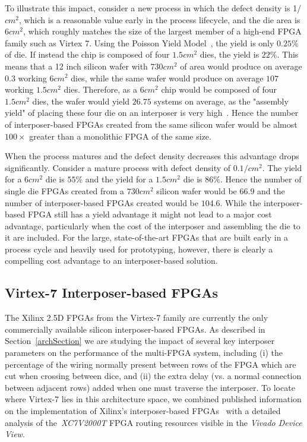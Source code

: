 \documentclass{sig-alternate-2013}
\begin{document}
To illustrate this impact, consider a new process in which the defect density is 1/$cm^2$, which is a reasonable value early in the process lifecycle, and the die area is $6cm^2$, which roughly matches the size of the largest member of a high-end FPGA family such as Virtex 7. Using the Poisson Yield Model~\cite{yieldmodel}, the yield is only $0.25\%$ of die. If instead the chip is composed of four $1.5cm^2$ dies, the yield is $22\%$. This means that a 12 inch silicon wafer with $730cm^2$ of area would produce on average $0.3$ working $6cm^2$ dies, while the same wafer would produce on average $107$ working $1.5cm^2$ dies. Therefore, as a $6cm^2$ chip would be composed of four $1.5cm^2$ dies, the wafer would yield $26.75$ systems on average, as the "assembly yield" of placing these four die on an interposer is very high~\cite{xilinxTSV}. Hence the number of interposer-based FPGAs created from the same silicon wafer would be almost $100\times$ greater than a monolithic FPGA of the same size.

When the process matures and the defect density decreases this advantage drops significantly. Consider a mature process with defect density of $0.1/cm^2$. The yield for a $6cm^2$ die is $55\%$ and the yield for a $1.5cm^2$ die is $86\%$. Hence the number of single die FPGAs created from a $730cm^2$ silicon wafer would be $66.9$ and the number of interposer-based FPGAs created would be $104.6$. While the interposer-based FPGA still has a yield advantage it might not lead to a major cost advantage, particularly when the cost of the interposer and assembling the die to it are included. For the large, state-of-the-art FPGAs that are built early in a process cycle and heavily used for prototyping, however, there is clearly a compelling cost advantage to an interposer-based solution.

\subsection{Virtex-7 Interposer-based FPGAs}
\label{virtex7section}

The Xilinx 2.5D FPGAs from the Virtex-7 family are currently the only commercially available silicon interposer-based FPGAs. As described in Section~\ref{archSection} we are studying the impact of several key interposer parameters on the performance of the multi-FPGA system, including (i) the percentage of the wiring normally present between rows of the FPGA which are cut when crossing between dice, and (ii) the extra delay (vs. a normal connection between adjacent rows) added when one must traverse the interposer.  To locate where Virtex-7 lies in this architecture space, we combined published information on the implementation of Xilinx's interposer-based FPGAs~\cite{xilinxTSV} with a detailed analysis of the~\textit{XC7V2000T} FPGA routing resources visible in the \textit{Vivado Device View}.
\end{document}
